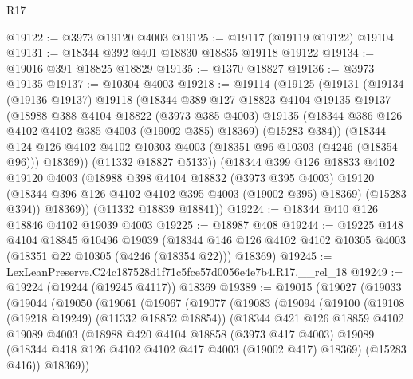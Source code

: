 \begin{lexlean}{R17}
\begin{coremodule}
@19122 := @3973 @19120 @4003
@19125 := @19117 (@19119 @19122) @19104
@19131 := @18344 @392 @401 @18830 @18835 @19118 @19122
@19134 := @19016 @391 @18825 @18829
@19135 := @1370 @18827
@19136 := @3973 @19135
@19137 := @10304 @4003
@19218 := @19114
    (@19125
      (@19131
        (@19134
          (@19136 @19137)
          @19118
          (@18344
            @389
            @127
            @18823
            @4104
            @19135
            @19137
            (@18988
              @388
              @4104
              @18822
              (@3973 @385 @4003)
              @19135
              (@18344 @386 @126 @4102 @4102 @385 @4003 (@19002 @385) @18369)
              (@15283 @384))
            (@18344
              @124
              @126
              @4102
              @4102
              @10303
              @4003
              (@18351 @96 @10303 (@4246 (@18354 @96)))
              @18369))
          (@11332 @18827 @5133))
        (@18344
          @399
          @126
          @18833
          @4102
          @19120
          @4003
          (@18988
            @398
            @4104
            @18832
            (@3973 @395 @4003)
            @19120
            (@18344 @396 @126 @4102 @4102 @395 @4003 (@19002 @395) @18369)
            (@15283 @394))
          @18369))
      (@11332 @18839 @18841))
@19224 := @18344 @410 @126 @18846 @4102 @19039 @4003
@19225 := @18987 @408
@19244 := @19225
    @148
    @4104
    @18845
    @10496
    @19039
    (@18344 @146 @126 @4102 @4102 @10305 @4003 (@18351 @22 @10305 (@4246 (@18354 @22))) @18369)
@19245 := LexLeanPreserve.C24c187528d1f71c5fce57d0056e4e7b4.R17.__rel_18
@19249 := @19224 (@19244 (@19245 @4117)) @18369
@19389 := @19015
    (@19027
      (@19033
        (@19044
          (@19050
            (@19061
              (@19067
                (@19077
                  (@19083
                    (@19094
                      (@19100
                        (@19108 (@19218 @19249) (@11332 @18852 @18854))
                        (@18344
                          @421
                          @126
                          @18859
                          @4102
                          @19089
                          @4003
                          (@18988
                            @420
                            @4104
                            @18858
                            (@3973 @417 @4003)
                            @19089
                            (@18344 @418 @126 @4102 @4102 @417 @4003 (@19002 @417) @18369)
                            (@15283 @416))
                          @18369))

\end{coremodule}
\end{lexlean}
